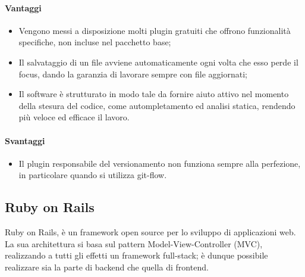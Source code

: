 \paragraph{Vantaggi}
\begin{itemize}
	\item Vengono messi a disposizione molti plugin gratuiti che offrono funzionalità specifiche, non incluse nel pacchetto base;
	\item Il salvataggio di un file avviene automaticamente ogni volta che esso perde il focus, dando la garanzia di lavorare sempre con file aggiornati;
	\item Il software è strutturato in modo tale da fornire aiuto attivo nel momento della stesura del codice, come autompletamento ed analisi statica, rendendo più veloce ed efficace il lavoro.
\end{itemize}
\paragraph{Svantaggi}
\begin{itemize}
	\item Il plugin responsabile del versionamento non funziona sempre alla perfezione, in particolare quando si utilizza git-flow.
\end{itemize}

\subsection{Ruby on Rails}

Ruby on Rails, è un framework open source per lo sviluppo di applicazioni web.
La sua architettura si basa sul pattern Model-View-Controller (MVC), realizzando a tutti gli effetti un framework full-stack; è dunque possibile realizzare sia la parte di backend che quella di frontend.
